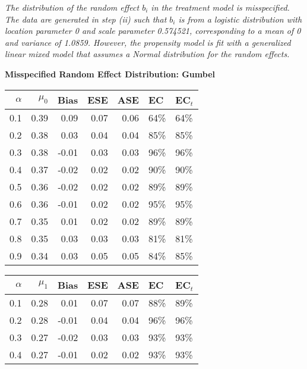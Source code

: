 \documentclass[12pt, letterpaper]{article}
\begin{document}
\begin{table}[ht!]
{\textit{The distribution of the random effect $b_i$ in the treatment model is misspecified. The data are generated in step (ii) such that $b_i$ is from a logistic distribution with location parameter 0 and scale parameter 0.574521, corresponding to a mean of 0 and variance of 1.0859. However, the propensity model is fit with a generalized linear mixed model that assumes a Normal distribution for the random effects.}}
\end{table}

\clearpage 



\begin{center}
\textbf{Misspecified Random Effect Distribution: Gumbel} 
\end{center}
\begin{table}[ht!]
\centering
\bgroup
\def\arraystretch{1.25}
\setlength\tabcolsep{0.05in}
\begin{tabular}{rrrrrll}
  \hline
$\alpha$ & $\mu_0$ & Bias & ESE & ASE & EC & EC$_t$ \\ 
  \hline
0.1 & 0.39 & 0.09 & 0.07 & 0.06 & 64\% & 64\% \\ 
  0.2 & 0.38 & 0.03 & 0.04 & 0.04 & 85\% & 85\% \\ 
  0.3 & 0.38 & -0.01 & 0.03 & 0.03 & 96\% & 96\% \\ 
  0.4 & 0.37 & -0.02 & 0.02 & 0.02 & 90\% & 90\% \\ 
  0.5 & 0.36 & -0.02 & 0.02 & 0.02 & 89\% & 89\% \\ 
  0.6 & 0.36 & -0.01 & 0.02 & 0.02 & 95\% & 95\% \\ 
  0.7 & 0.35 & 0.01 & 0.02 & 0.02 & 89\% & 89\% \\ 
  0.8 & 0.35 & 0.03 & 0.03 & 0.03 & 81\% & 81\% \\ 
  0.9 & 0.34 & 0.03 & 0.05 & 0.05 & 84\% & 85\% \\     \hline
\end{tabular}
\egroup
\quad 
\bgroup
\setlength\tabcolsep{0.05in}
\def\arraystretch{1.25}
\begin{tabular}{rrrrrll}
  \hline
$\alpha$ & $\mu_1$ & Bias & ESE & ASE & EC & EC$_t$ \\ 
  \hline
0.1 & 0.28 & 0.01 & 0.07 & 0.07 & 88\% & 89\% \\ 
  0.2 & 0.28 & -0.01 & 0.04 & 0.04 & 96\% & 96\% \\ 
  0.3 & 0.27 & -0.02 & 0.03 & 0.03 & 93\% & 93\% \\ 
  0.4 & 0.27 & -0.01 & 0.02 & 0.02 & 93\% & 93\% \\ 

\end{tabular}
\end{table}
\end{document}
